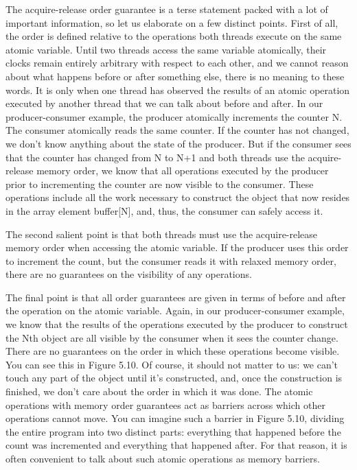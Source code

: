 The acquire-release order guarantee is a terse statement packed with a lot of important information, so let us elaborate on a few distinct points. First of all, the order is defined relative to the operations both threads execute on the same atomic variable. Until two threads access the same variable atomically, their clocks remain entirely arbitrary with respect to each other, and we cannot reason about what happens before or after something else, there is no meaning to these words. It is only when one thread has observed the results of an atomic operation executed by another thread that we can talk about before and after. In our producer-consumer example, the producer atomically increments the counter N. The consumer atomically reads the same counter. If the counter has not changed, we don't know anything about the state of the producer. But if the consumer sees that the counter has changed from N to N+1 and both threads use the acquire-release memory order, we know that all operations executed by the producer prior to incrementing the counter are now visible to the consumer. These operations include all the work necessary to construct the object that now resides in the array element buffer[N], and, thus, the consumer can safely access it.

The second salient point is that both threads must use the acquire-release memory order when accessing the atomic variable. If the producer uses this order to increment the count, but the consumer reads it with relaxed memory order, there are no guarantees on the visibility of any operations.

The final point is that all order guarantees are given in terms of before and after the operation on the atomic variable. Again, in our producer-consumer example, we know that the results of the operations executed by the producer to construct the Nth object are all visible by the consumer when it sees the counter change. There are no guarantees on the order in which these operations become visible. You can see this in Figure 5.10. Of course, it should not matter to us: we can't touch any part of the object until it's constructed, and, once the construction is finished, we don't care about the order in which it was done. The atomic operations with memory order guarantees act as barriers across which other operations cannot move. You can imagine such a barrier in Figure 5.10, dividing the entire program into two distinct parts: everything that happened before the count was incremented and everything that happened after. For that reason, it is often convenient to talk about such atomic operations as memory barriers.

